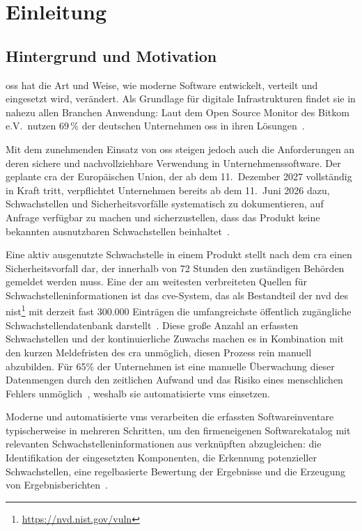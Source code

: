 \chapter{Einleitung}\label{ch:einleitung}


\section{Hintergrund und Motivation}\label{sec:hintergrund-motivation}

\acrfull{oss} hat die Art und Weise, wie moderne Software entwickelt, verteilt und eingesetzt wird, verändert.
Als Grundlage für digitale Infrastrukturen findet sie in nahezu allen Branchen Anwendung:
Laut dem Open Source Monitor des Bitkom e.V.\ nutzen 69\,\% der deutschen Unternehmen \acrshort{oss} in ihren Lösungen\ \autocite{OpenSourceMonitorWintergerst}.

Mit dem zunehmenden Einsatz von \acrshort{oss} steigen jedoch auch die Anforderungen an deren sichere und nachvollziehbare Verwendung in Unternehmenssoftware.
Der geplante \acrfull{cra} der Europäischen Union, der ab dem 11.\ Dezember 2027 vollständig in Kraft tritt,
verpflichtet Unternehmen bereits ab dem 11.\ Juni 2026 dazu, Schwachstellen und Sicherheitsvorfälle systematisch zu dokumentieren,
auf Anfrage verfügbar zu machen und sicherzustellen, dass das Produkt keine bekannten ausnutzbaren Schwachstellen beinhaltet\ \autocite{eu2024cra}.

Eine aktiv ausgenutzte Schwachstelle in einem Produkt stellt nach dem \acrshort{cra} einen Sicherheitsvorfall dar, der innerhalb von 72 Stunden den zuständigen Behörden gemeldet werden muss.
Eine der am weitesten verbreiteten Quellen für Schwachstelleninformationen ist das \acrfull{cve}-System, das als Bestandteil der \acrfull{nvd} des \acrfull{nist}\footnote{\url{https://nvd.nist.gov/vuln}} mit derzeit fast 300.000 Einträgen die umfangreichste öffentlich zugängliche Schwachstellendatenbank darstellt\ \autocite{nvd12mai2025dashboard}.
Diese große Anzahl an erfassten Schwachstellen und der kontinuierliche Zuwachs machen es in Kombination mit den kurzen Meldefristen des \acrshort{cra} unmöglich, diesen Prozess rein manuell abzubilden.
Für 65\% der Unternehmen ist eine manuelle Überwachung dieser Datenmengen durch den zeitlichen Aufwand und das Risiko eines menschlichen Fehlers unmöglich\ \autocite{OpenSourceMonitorWintergerst}, weshalb sie automatisierte \acrfull{vms} einsetzen.

Moderne und automatisierte \acrshort{vms} verarbeiten die erfassten Softwareinventare typischerweise in mehreren Schritten, um den firmeneigenen Softwarekatalog mit relevanten Schwachstelleninformationen aus verknüpften  abzugleichen:
die Identifikation der eingesetzten Komponenten, die Erkennung potenzieller Schwachstellen, eine regelbasierte Bewertung der Ergebnisse und die Erzeugung von Ergebnisberichten\ \autocite{Idrissi_Sebai_Faroukhi_Mahouachi_2024}.

